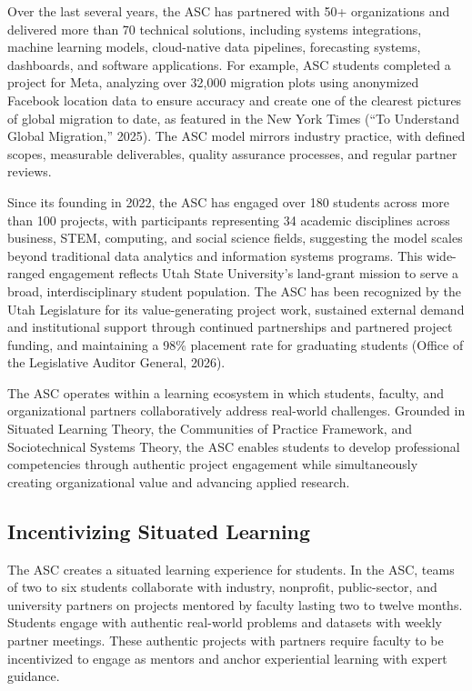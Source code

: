 \documentclass[
  12pt]{article}
\begin{document}
Over the last several years, the ASC has partnered with 50+
organizations and delivered more than 70 technical solutions, including
systems integrations, machine learning models, cloud-native data
pipelines, forecasting systems, dashboards, and software applications.
For example, ASC students completed a project for Meta, analyzing over
32,000 migration plots using anonymized Facebook location data to ensure
accuracy and create one of the clearest pictures of global migration to
date, as featured in the New York Times (``To Understand Global
Migration,'' 2025). The ASC model mirrors industry practice, with
defined scopes, measurable deliverables, quality assurance processes,
and regular partner reviews.

Since its founding in 2022, the ASC has engaged over 180 students across
more than 100 projects, with participants representing 34 academic
disciplines across business, STEM, computing, and social science fields,
suggesting the model scales beyond traditional data analytics and
information systems programs. This wide-ranged engagement reflects Utah
State University's land-grant mission to serve a broad,
interdisciplinary student population. The ASC has been recognized by the
Utah Legislature for its value-generating project work, sustained
external demand and institutional support through continued partnerships
and partnered project funding, and maintaining a 98\% placement rate for
graduating students (Office of the Legislative Auditor General, 2026).

The ASC operates within a learning ecosystem in which students, faculty,
and organizational partners collaboratively address real-world
challenges. Grounded in Situated Learning Theory, the Communities of
Practice Framework, and Sociotechnical Systems Theory, the ASC enables
students to develop professional competencies through authentic project
engagement while simultaneously creating organizational value and
advancing applied research.

\subsection{Incentivizing Situated
Learning}\label{incentivizing-situated-learning}

The ASC creates a situated learning experience for students. In the ASC,
teams of two to six students collaborate with industry, nonprofit,
public-sector, and university partners on projects mentored by faculty
lasting two to twelve months. Students engage with authentic real-world
problems and datasets with weekly partner meetings. These authentic
projects with partners require faculty to be incentivized to engage as
mentors and anchor experiential learning with expert guidance.
\end{document}
